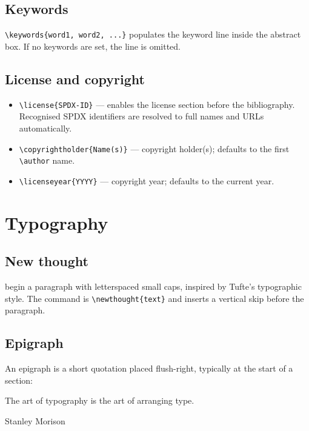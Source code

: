 \documentclass[sans,oneside,numeric,raggedright]{qarticle}
\begin{document}
\subsection{Keywords}

\verb|\keywords{word1, word2, ...}| populates the keyword line inside the
abstract box.  If no keywords are set, the line is omitted.

\subsection{License and copyright}

\begin{itemize}
    \item \verb|\license{SPDX-ID}| --- enables the license section before the
    bibliography.  Recognised SPDX identifiers are resolved to full names
    and URLs automatically.
    \item \verb|\copyrightholder{Name(s)}| --- copyright holder(s); defaults
    to the first \verb|\author| name.
    \item \verb|\licenseyear{YYYY}| --- copyright year; defaults to the
    current year.
\end{itemize}

\section{Typography}\label{sec:typography}

\subsection{New thought}

 begin a paragraph with letterspaced small caps,
inspired by Tufte's typographic style.  The command is
\verb|\newthought{text}| and inserts a vertical skip before the paragraph.

\lipsum[2]

\subsection{Epigraph}

An epigraph is a short quotation placed flush-right, typically at the start
of a section:

\epigraph{The art of typography is the art of arranging type.}{Stanley Morison}
\end{document}
